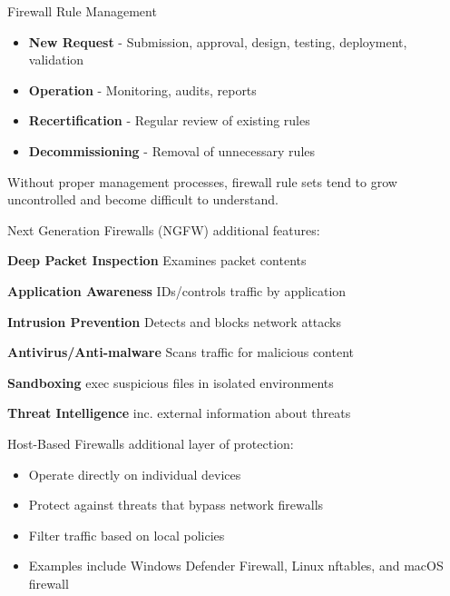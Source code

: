 \begin{concept}{Firewall Rule Management}
\begin{itemize}
    \item \textbf{New Request} - Submission, approval, design, testing, deployment, validation
    \item \textbf{Operation} - Monitoring, audits, reports
    \item \textbf{Recertification} - Regular review of existing rules
    \item \textbf{Decommissioning} - Removal of unnecessary rules
\end{itemize}
Without proper management processes, firewall rule sets tend to grow uncontrolled and become difficult to understand.
\end{concept}






\begin{definition}{Next Generation Firewalls (NGFW)}
additional features:

\textbf{Deep Packet Inspection} Examines packet contents

\textbf{Application Awareness} IDs/controls traffic by application

\textbf{Intrusion Prevention} Detects and blocks network attacks

\textbf{Antivirus/Anti-malware} Scans traffic for malicious content

\textbf{Sandboxing} exec suspicious files in isolated environments

\textbf{Threat Intelligence} inc. external information about threats

\end{definition}



\begin{definition}{Host-Based Firewalls}
additional layer of protection:
\begin{itemize}
    \item Operate directly on individual devices
    \item Protect against threats that bypass network firewalls
    \item Filter traffic based on local policies
    \item Examples include Windows Defender Firewall, Linux nftables, and macOS firewall
\end{itemize}
\end{definition}

